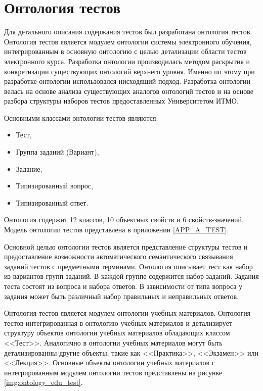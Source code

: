 \section{Онтология тестов} \label{sect2_3}

Для детального описания содержания тестов был разработана онтология тестов. Онтология тестов является модулем онтологии системы электронного обучения, интегрированным в основную онтологию с целью детализации области тестов электронного курса. Разработка онтологии производилась методом раскрытия и конкретизации существующих онтологий верхнего уровня. Именно по этому при разработке онтологии использовался нисходящий подход. Разработка онтологии велась на основе анализа существующих аналогов онтологий тестов и на основе разбора структуры наборов тестов предоставленных Университетом ИТМО.

Основными классами онтологии тестов являются:

\begin{itemize}
\item Тест,
\item Группа заданий (Вариант),
\item Задание,
\item Типизированный вопрос,
\item Типизированный ответ.
\end{itemize}

Онтология содержит 12 классов, 10 объектных свойств и 6 свойств-значений. Модель онтологии тестов представлена в приложении \ref{APP_A_TEST}.

Основной целью онтологии тестов является представление структуры тестов и предоставление возможности автоматического семантического связывания заданий тестов с предметными терминами. Онтология описывает тест как набор из вариантов групп заданий. В каждой группе содержится набор заданий. Задания теста состоят из вопроса и набора ответов. В зависимости от типа вопроса у задания может быть различный набор правильных и неправильных ответов.

Онтология тестов является модулем онтологии учебных материалов. Онтология тестов интегрированная в онтологию учебных материалов и детализирует структуру объектов онтологии учебных материалов обладающих классом <<Тест>>. Аналогично в онтологии учебных материалов могут быть детализированны другие объекты, такие как <<Практика>>, <<Экзамен>> или <<Лекция>>. Основные объекты онтологии учебных материалов с интегрированным модулем онтологии тестов представлены на рисунке \ref{img:ontology_edu_test}.  

